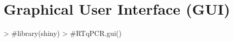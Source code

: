 \documentclass[11pt]{article}
\begin{document}
\section{Graphical User Interface (GUI)} 

\begin{Schunk}
\begin{Sinput}
> #library(shiny)
> #RTqPCR.gui()
\end{Sinput}
\end{Schunk}

\end{document}
